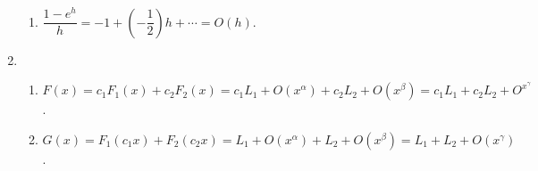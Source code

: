\documentclass[12pt]{article}
\begin{document}
\begin{enumerate}
\begin{enumerate}
        \item $\dfrac{1-e^h}{h} = -1 + (-\dfrac{1}{2})h + \cdots = O(h)$.
    \end{enumerate}

    \item\begin{enumerate}
        \item $F(x) = c_1F_1(x) + c_2F_2(x) = c_1L_1 + O(x^\alpha) + c_2L_2 + O(x^\beta) = c_1L_1 + c_2L_2 + O^{x^{\gamma}}$.
        
        \item $G(x) = F_1(c_1x) + F_2(c_2x) = L_1 + O(x^\alpha) + L_2 + O(x^\beta) = L_1 + L_2 + O(x^\gamma)$.
    \end{enumerate}
\end{enumerate}
\end{document}
